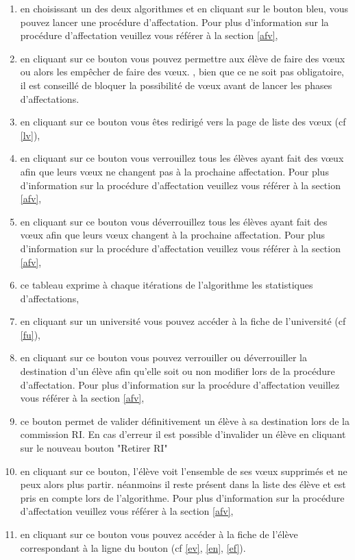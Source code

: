              \begin{enumerate}
             	\item en choisissant un des deux algorithmes et en cliquant sur le bouton bleu, vous pouvez lancer une procédure d'affectation. Pour plus d'information sur la procédure d'affectation veuillez vous référer à la section \ref{afv},
             	\item en cliquant sur ce bouton vous pouvez permettre aux élève de faire des vœux ou alors les empêcher de faire des vœux. \att , bien que ce ne soit pas obligatoire, il est conseillé de bloquer la possibilité de vœux avant de lancer les phases d'affectations.
             	\item en cliquant sur ce bouton vous êtes redirigé vers la page de liste des vœux (cf \ref{lv}),
             	\item en cliquant sur ce bouton vous verrouillez tous les élèves ayant fait des vœux afin que leurs vœux ne changent pas à la prochaine affectation. Pour plus d'information sur la procédure d'affectation veuillez vous référer à la section \ref{afv}, 
             	\item en cliquant sur ce bouton vous déverrouillez tous les élèves ayant fait des vœux afin que leurs vœux changent à la prochaine affectation. Pour plus d'information sur la procédure d'affectation veuillez vous référer à la section \ref{afv}, 
             	\item ce tableau exprime à chaque itérations de l'algorithme les statistiques d'affectations,
             	\item en cliquant sur un université vous pouvez accéder à la fiche de l'université (cf \ref{fu}), 
             	\item en cliquant sur ce bouton vous pouvez verrouiller ou déverrouiller la destination d'un élève afin qu'elle soit ou non modifier lors de la procédure d'affectation. Pour plus d'information sur la procédure d'affectation veuillez vous référer à la section \ref{afv},
             	\item ce bouton permet de valider définitivement un élève à sa destination lors de la commission RI. En cas d'erreur il est possible d'invalider un élève en cliquant sur le nouveau bouton "Retirer RI"
             	\item en cliquant sur ce bouton, l'élève voit l'ensemble de ses vœux supprimés et ne peux alors plus partir. néanmoins il reste présent dans la liste des élève et est pris en compte lors de l'algorithme. Pour plus d'information sur la procédure d'affectation veuillez vous référer à la section \ref{afv},
			   	\item en cliquant sur ce bouton vous pouvez accéder à la fiche de l'élève correspondant à la ligne du bouton (cf \ref{ev}, \ref{en}, \ref{ef}).
             \end{enumerate}
    
